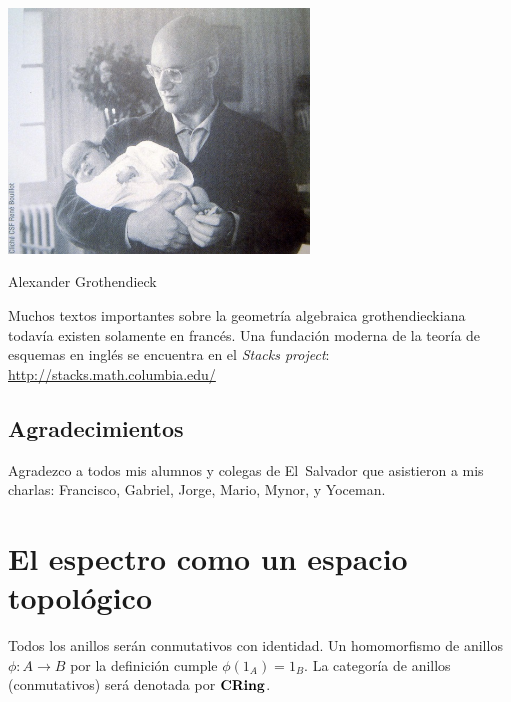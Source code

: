 \documentclass{article}
\numberwithin{equation}{section}
\theoremstyle{definition}
\begin{document}
\begin{center}
  \noindent \includegraphics[width=8cm]{grothendieck.jpg}

  \vspace{1em}

  \noindent Alexander Grothendieck
\end{center}

Muchos textos importantes sobre la geometría algebraica grothendieckiana todavía
existen solamente en francés. Una fundación moderna de la teoría de esquemas
en inglés se encuentra en el \emph{Stacks project}:
\url{http://stacks.math.columbia.edu/}

\subsection*{Agradecimientos}

Agradezco a todos mis alumnos y colegas de El~Salvador que asistieron a mis
charlas: Francisco, Gabriel, Jorge, Mario, Mynor, y Yoceman.

\pagebreak

{\small\tableofcontents}

\pagebreak


\section{El espectro como un espacio topológico}


Todos los anillos serán conmutativos con identidad. Un homomorfismo de anillos
$\phi\colon A\to B$ por la definición cumple $\phi (1_A) = 1_B$. La categoría
de anillos (conmutativos) será denotada por $\text{\bf CRing}$.
\end{document}

